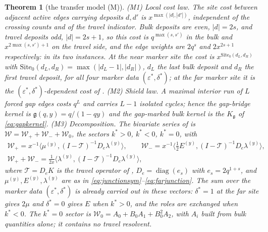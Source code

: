\documentclass[11pt]{article}
\theoremstyle{plain}
\newtheorem{theorem}{Theorem}
\theoremstyle{definition}
\theoremstyle{remark}
\theoremstyle{plain}\newtheorem*{maintheorem}{Main Theorem}
\begin{document}
\begin{theorem}[the transfer model \textup{(M)}]\label{hyp:model}\label{thm:model}
\textup{(M1)} \emph{Local cost law.} The site cost between adjacent active edges carrying deposits
$d,d'$ is $x^{\max(|d|,|d'|)}$, independent of the crossing counts and of the travel indicator.
Bulk deposits are even, $|d|=2s$, and travel deposits odd, $|d|=2s+1$, so this cost is
$q^{\max(s,s')}$ in the bulk and $x^{2\max(s,s')+1}$ on the travel side, and the edge weights are
$2q^s$ and $2x^{2s+1}$ respectively: {\cite[Definition ``section identity'', \textup{def:model}]{Bonfioli2026bB}} in its two instances.
At the near marker site the cost is $x^{\mathrm{Site}_0(d_L,d_R)}$ with
$\mathrm{Site}_0(d_L,d_R)=\max(|d_L-1|,|d_R|)$, $d_L$ the last bulk deposit and $d_R$ the first
travel deposit, for all four marker data $(\varepsilon^\ast,\delta^\ast)$; at the far marker site
it is the $(\varepsilon^\ast,\delta^\ast)$-dependent cost of {\cite[Corollary ``the marker junctions'', \textup{cor:marker}]{Bonfioli2026bB}}.
\textup{(M2)} \emph{Shield law.} A maximal interior run of $L$ forced gap edges costs $q^L$ and
carries $L-1$ isolated cycles; hence the gap-bridge kernel is $\mathfrak g(q,y)=q/(1-qy)$ and the
gap-marked bulk kernel is the $K_{\mathfrak g}$ of \eqref{eq:gapkernel}.
\textup{(M3)} \emph{Decomposition.} The bivariate series of {\cite[\S\,\textup{sec:bridge}]{Bonfioli2026bB}} is
$\mathcal W=\mathcal W_++\mathcal W_-+\mathcal W_0$, the sectors $k^\ast>0$, $k^\ast<0$, $k^\ast=0$,
with
\begin{equation}\label{eq:assembly}
 \begin{gathered}
   \mathcal W_+=x^{-1}\bigl\langle\mu^{(y)},(I-\mathcal T)^{-1}D_e\lambda^{(y)}\bigr\rangle,\qquad
   \mathcal W_-=x^{-1}\bigl\langle\tfrac12E^{(y)},(I-\mathcal T)^{-1}D_e\lambda^{(y)}\bigr\rangle,\\
   \mathcal W_++\mathcal W_-=\frac1{2x}\bigl\langle\lambda^{(y)},(I-\mathcal T)^{-1}D_e\lambda^{(y)}\bigr\rangle,
 \end{gathered}
\end{equation}
where $\mathcal T=D_eK$ is the travel operator of {\cite[Definition ``section identity'', \textup{def:model}]{Bonfioli2026bB}},
$D_e=\operatorname{diag}(e_s)$ with $e_s=2q^{1+s}$, and $\mu^{(y)},E^{(y)},\lambda^{(y)}$ are as in
\eqref{eq:junctionsym}--\eqref{eq:farjunction}. The sum over the marker data
$(\varepsilon^\ast,\delta^\ast)$ is already carried out in these vectors: $\delta^\ast=1$ at the far
site gives $2\mu$ and $\delta^\ast=0$ gives $E$ when $k^\ast>0$, and the roles are exchanged when
$k^\ast<0$. The $k^\ast=0$ sector is
$\mathcal W_0=A_0+B_0A_1+B_0^2A_2$, with $A_i$ built from bulk quantities alone; it contains no
travel resolvent.
\end{theorem}
\end{document}
